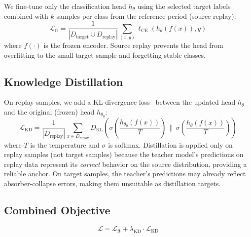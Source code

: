 \documentclass[journal]{IEEEtran}
\begin{document}
We fine-tune only the classification head $h_\theta$ using the selected target labels combined with $k$ samples per class from the reference period (source replay):
\begin{equation}
  \mathcal{L}_{\text{ft}} = \frac{1}{|D_{\text{target}} \cup D_{\text{replay}}|} \sum_{(x,y)} \ell_{\text{CE}}(h_\theta(f(x)), y)
\end{equation}
where $f(\cdot)$ is the frozen encoder.
Source replay prevents the head from overfitting to the small target sample and forgetting stable classes.

\subsection{Knowledge Distillation}

On replay samples, we add a KL-divergence loss~\cite{hinton2015distilling} between the updated head $h_\theta$ and the original (frozen) head $h_{\theta_0}$:
\begin{equation}
  \mathcal{L}_{\text{KD}} = \frac{1}{|D_{\text{replay}}|} \sum_{x \in D_{\text{replay}}} D_{\text{KL}}\!\left(\sigma\!\left(\frac{h_{\theta_0}(f(x))}{T}\right) \,\Big\|\, \sigma\!\left(\frac{h_\theta(f(x))}{T}\right)\right)
\end{equation}
where $T$ is the temperature and $\sigma$ is softmax.
Distillation is applied only on replay samples (not target samples) because the teacher model's predictions on replay data represent its \textit{correct} behavior on the source distribution, providing a reliable anchor. On target samples, the teacher's predictions may already reflect absorber-collapse errors, making them unsuitable as distillation targets.

\subsection{Combined Objective}

\begin{equation}
  \mathcal{L} = \mathcal{L}_{\text{ft}} + \lambda_{\text{KD}} \cdot \mathcal{L}_{\text{KD}}
\end{equation}
\end{document}
